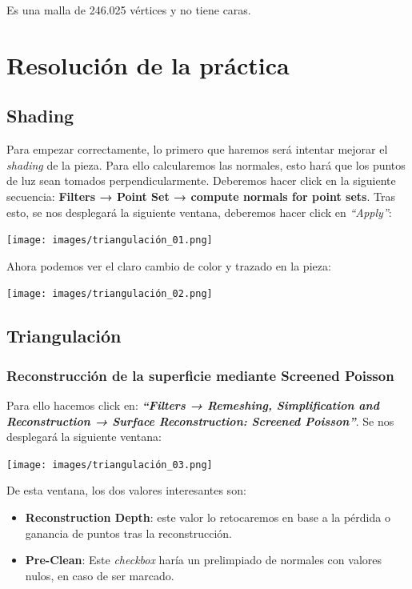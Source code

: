 \documentclass[options]{article}
\begin{document}
Es una malla de 246.025 vértices y no tiene caras.
\pagebreak

\section{Resolución de la práctica}
\subsection{Shading}

Para empezar correctamente, lo primero que haremos será intentar mejorar el \textit{shading} de la pieza. Para ello calcularemos las normales, esto hará que los puntos de luz sean tomados perpendicularmente. Deberemos hacer click en la siguiente secuencia: \textbf{Filters → Point Set → compute normals for point sets}. Tras esto, se nos desplegará la siguiente ventana, deberemos hacer click en \textit{``Apply''}:

\begin{center}
    \texttt{[image: images/triangulación\_01.png]}    
\end{center}

Ahora podemos ver el claro cambio de color y trazado en la pieza:
\begin{center}
    \texttt{[image: images/triangulación\_02.png]}    
\end{center}

\subsection{Triangulación}

\subsubsection{Reconstrucción de la superficie mediante Screened Poisson}
Para ello hacemos click en: \textbf{\textit{``Filters → Remeshing, Simplification and Reconstruction → Surface Reconstruction: Screened Poisson''}}. Se nos desplegará la siguiente ventana:

\begin{center}
    \texttt{[image: images/triangulación\_03.png]}    
\end{center}

De esta ventana, los dos valores interesantes son:
\begin{itemize}
    \item \textbf{Reconstruction Depth}: este valor lo retocaremos en base a la pérdida o ganancia de puntos tras la reconstrucción.
    \item \textbf{Pre-Clean}: Este \textit{checkbox} haría un prelimpiado de normales con valores nulos, en caso de ser marcado.
\end{itemize}
\end{document}
